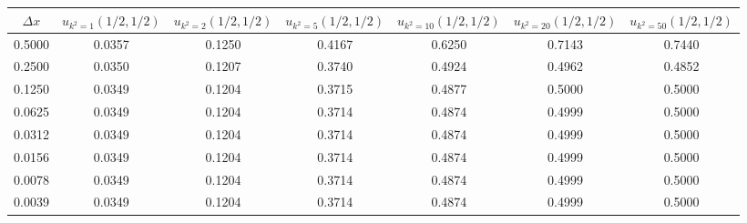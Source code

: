 \begin{tabular}{|c|c|c|c|c|c|c|}
\hline
\textbf{$\Delta x$}&\textbf{$u_{k^2=1}(1/2, 1/2)$}&\textbf{$u_{k^2=2}(1/2, 1/2)$}&\textbf{$u_{k^2=5}(1/2, 1/2)$}&\textbf{$u_{k^2=10}(1/2, 1/2)$}&\textbf{$u_{k^2=20}(1/2, 1/2)$}&\textbf{$u_{k^2=50}(1/2, 1/2)$}\\\hline
0.5000&0.0357&0.1250&0.4167&0.6250&0.7143&0.7440\\\hline
0.2500&0.0350&0.1207&0.3740&0.4924&0.4962&0.4852\\\hline
0.1250&0.0349&0.1204&0.3715&0.4877&0.5000&0.5000\\\hline
0.0625&0.0349&0.1204&0.3714&0.4874&0.4999&0.5000\\\hline
0.0312&0.0349&0.1204&0.3714&0.4874&0.4999&0.5000\\\hline
0.0156&0.0349&0.1204&0.3714&0.4874&0.4999&0.5000\\\hline
0.0078&0.0349&0.1204&0.3714&0.4874&0.4999&0.5000\\\hline
0.0039&0.0349&0.1204&0.3714&0.4874&0.4999&0.5000\\\hline
\end{tabular}
